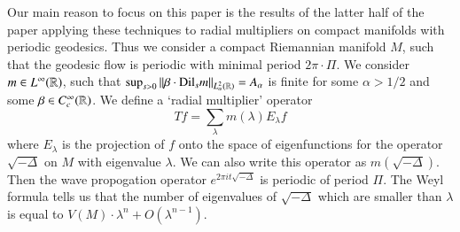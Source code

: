 Our main reason to focus on this paper is the results of the latter half of the paper applying these techniques to radial multipliers on compact manifolds with periodic geodesics. Thus we consider a compact Riemannian manifold $M$, such that the geodesic flow is periodic with minimal period $2 \pi \cdot \Pi$. We consider $m \in L^\infty(\operatorname{\mathbb{R}})$, such that $\sup_{s > 0} \| \beta \cdot \text{Dil}_s m \|_{L^2_\alpha(\operatorname{\mathbb{R}})} = A_\alpha$ is finite for some $\alpha > 1/2$ and some $\beta \in C_c^\infty(\operatorname{\mathbb{R}})$. We define a `radial multiplier' operator
%
\[ Tf = \sum_\lambda m(\lambda) E_\lambda f \]
%
where $E_\lambda$ is the projection of $f$ onto the space of eigenfunctions for the operator $\sqrt{-\Delta}$ on $M$ with eigenvalue $\lambda$. We can also write this operator as $m(\sqrt{-\Delta})$. Then the wave propogation operator $e^{2 \pi i t \sqrt{-\Delta}}$ is periodic of period $\Pi$. The Weyl formula tells us that the number of eigenvalues of $\sqrt{-\Delta}$ which are smaller than $\lambda$ is equal to $V(M) \cdot \lambda^n + O(\lambda^{n-1})$.

